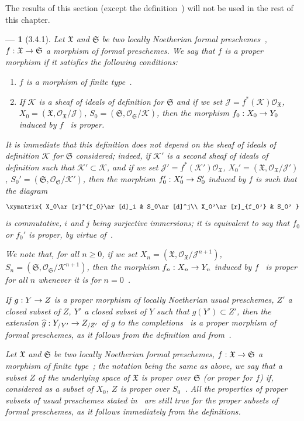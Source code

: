 \documentclass[oneside]{amsart}
\theoremstyle{ega-env-style}
\newtheorem*{env}{---}
\theoremstyle{ega-thm-env-style}
\theoremstyle{ega-defn-env-style}
\def\mathcal{\mathscr}
\def\sh{\mathcal}                   %
\def\geq{\geqslant}                 %
\renewcommand{\to}{\mathchoice{\longrightarrow}{\rightarrow}{\rightarrow}{\rightarrow}}
\newcommand{\oldpage}[2][]{{\marginnote{\normalfont{\textbf{#1}~|~#2}}}\ignorespaces}
\let\EGAOriginalLabel\label
\renewcommand{\label}[1]{\phantomsection\EGAOriginalLabel{#1}}
\begin{document}
\oldpage[III]{119}
The results of this section (except the definition~) will not be used in the rest of this chapter.

\begin{env}[3.4.1]
\label{III.3.4.1}
Let $\mathfrak{X}$ and $\mathfrak{S}$ be two locally Noetherian formal preschemes~, $f:\mathfrak{X}\to\mathfrak{S}$ a morphism of formal preschemes.
We say that $f$ is a \emph{proper} morphism if it satisfies the following conditions:
\begin{enumerate}
  \item[1st.] \emph{$f$ is a morphism of finite type~}.
  \item[2nd.] \emph{If $\sh{K}$ is a sheaf of ideals of definition for $\mathfrak{S}$ and if we set $\sh{J}=f^*(\sh{K})\sh{O}_\mathfrak{X}$, $X_0=(\mathfrak{X},\sh{O}_\mathfrak{X}/\sh{J})$, $S_0=(\mathfrak{S},\sh{O}_\mathfrak{S}/\sh{K})$, then the morphism $f_0:X_0\to Y_0$ induced by $f$~ is proper}.
\end{enumerate}
It is immediate that this definition does not depend on the sheaf of ideals of definition $\sh{K}$ for $\mathfrak{S}$ considered; indeed, if $\sh{K}'$ is a second sheaf of ideals of definition such that $\sh{K}'\subset\sh{K}$, and if we set $\sh{J}'=f^*(\sh{K}')\sh{O}_\mathfrak{X}$, $X_0'=(\mathfrak{X},\sh{O}_\mathfrak{X}/\sh{J}')$, $S_0'=(\mathfrak{S},\sh{O}_\mathfrak{S}/\sh{K}')$, then the morphism $f_0':X_0'\to S_0'$ induced by $f$ is such that the diagram
\[
  \xymatrix{
    X_0\ar[r]^{f_0}\ar[d]_i &
    S_0\ar[d]^j\\
    X_0'\ar[r]_{f_0'} &
    S_0'
  }
\]
is commutative, $i$ and $j$ being surjective immersions; it is equivalent to say that $f_0$ or $f_0'$ is proper, by virtue of~.

We note that, for all $n\geq 0$, if we set $X_n=(\mathfrak{X},\sh{O}_\mathfrak{X}/\sh{J}^{n+1})$, $S_n=(\mathfrak{S},\sh{O}_\mathfrak{S}/\sh{K}^{n+1})$, then the morphism $f_n:X_n\to Y_n$ induced by $f$~ is proper for all $n$ whenever it is for $n=0$~.

If $g:Y\to Z$ is a proper morphism of locally Noetherian usual preschemes, $Z'$ a closed subset of $Z$, $Y'$ a closed subset of $Y$ such that $g(Y')\subset Z'$, then the extension $\widehat{g}:Y_{/Y'}\to Z_{/Z'}$ of $g$ to the completions~ is a proper morphism of formal preschemes, as it follows from the definition and from~.

Let $\mathfrak{X}$ and $\mathfrak{S}$ be two locally Noetherian formal preschemes, $f:\mathfrak{X}\to\mathfrak{S}$ a morphism \emph{of finite type}~; the notation being the same as above, we say that a subset $Z$ of the underlying space of $\mathfrak{X}$ is \emph{proper} over $\mathfrak{S}$ (or proper for $f$) if, considered as a subset of $X_0$, $Z$ is \emph{proper over $S_0$}~.
All the properties of proper subsets of usual preschemes stated in~ are still true for the proper subsets of formal preschemes, as it follows immediately from the definitions.
\end{env}
\end{document}
